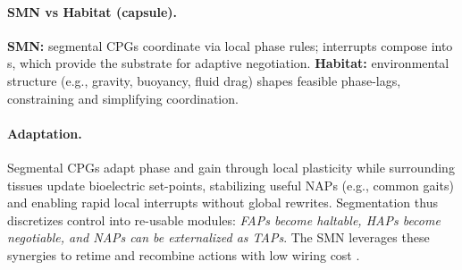 \paragraph{SMN vs Habitat (capsule).}
\textbf{SMN:} segmental CPGs coordinate via local phase rules; interrupts compose into \NAP{}s, which provide the substrate for adaptive negotiation.  
\textbf{Habitat:} environmental structure (e.g., gravity, buoyancy, fluid drag) shapes feasible phase-lags, constraining and simplifying coordination.  

\paragraph{Adaptation.}
Segmental CPGs adapt phase and gain through local plasticity while surrounding tissues update bioelectric set-points, stabilizing useful NAPs (e.g., common gaits) and enabling rapid local interrupts without global rewrites.  
Segmentation thus discretizes control into re-usable modules: \emph{FAPs become haltable, HAPs become negotiable, and NAPs can be externalized as TAPs}.  
The SMN leverages these synergies to retime and recombine actions with low wiring cost \citep{BizziCheung2013}.
